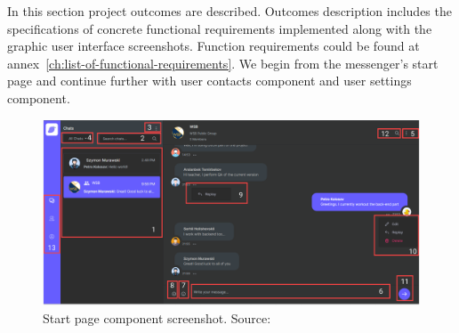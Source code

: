 In this section project outcomes are described.
Outcomes description includes the specifications of concrete functional requirements implemented along with the
graphic user interface screenshots.
Function requirements could be found at annex~\ref{ch:list-of-functional-requirements}.
We begin from the messenger's start page and continue further with user contacts component and user settings component.
\begin{figure}[H]
    \centering
    \includegraphics[width=1\textwidth]{Pictures/09_Messenger_startpage}
    \caption{Start page component screenshot. Source: }\label{fig:figure5}
\end{figure}

